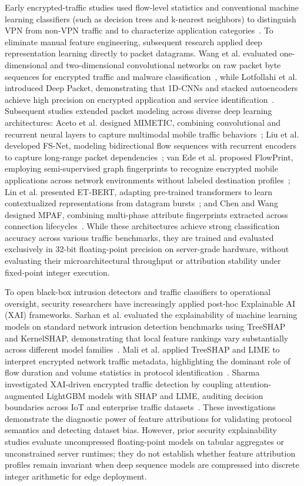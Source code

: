 \documentclass[conference]{IEEEtran}
\begin{document}
Early encrypted-traffic studies used flow-level statistics and conventional machine learning classifiers (such as decision trees and k-nearest neighbors) to distinguish VPN from non-VPN traffic and to characterize application categories~\cite{b1}. To eliminate manual feature engineering, subsequent research applied deep representation learning directly to packet datagrams. Wang et al. evaluated one-dimensional and two-dimensional convolutional networks on raw packet byte sequences for encrypted traffic and malware classification~\cite{b2}, while Lotfollahi et al. introduced Deep Packet, demonstrating that 1D-CNNs and stacked autoencoders achieve high precision on encrypted application and service identification~\cite{b3}. Subsequent studies extended packet modeling across diverse deep learning architectures: Aceto et al. designed MIMETIC, combining convolutional and recurrent neural layers to capture multimodal mobile traffic behaviors~\cite{b10}; Liu et al. developed FS-Net, modeling bidirectional flow sequences with recurrent encoders to capture long-range packet dependencies~\cite{b11}; van Ede et al. proposed FlowPrint, employing semi-supervised graph fingerprints to recognize encrypted mobile applications across network environments without labeled destination profiles~\cite{b12}; Lin et al. presented ET-BERT, adapting pre-trained transformers to learn contextualized representations from datagram bursts~\cite{b13}; and Chen and Wang designed MPAF, combining multi-phase attribute fingerprints extracted across connection lifecycles~\cite{b14}. While these architectures achieve strong classification accuracy across various traffic benchmarks, they are trained and evaluated exclusively in 32-bit floating-point precision on server-grade hardware, without evaluating their microarchitectural throughput or attribution stability under fixed-point integer execution.

To open black-box intrusion detectors and traffic classifiers to operational oversight, security researchers have increasingly applied post-hoc Explainable AI (XAI) frameworks. Sarhan et al. evaluated the explainability of machine learning models on standard network intrusion detection benchmarks using TreeSHAP and KernelSHAP, demonstrating that local feature rankings vary substantially across different model families~\cite{b15}. Mali et al. applied TreeSHAP and LIME to interpret encrypted network traffic metadata, highlighting the dominant role of flow duration and volume statistics in protocol identification~\cite{b16}. Sharma investigated XAI-driven encrypted traffic detection by coupling attention-augmented LightGBM models with SHAP and LIME, auditing decision boundaries across IoT and enterprise traffic datasets~\cite{b17}. These investigations demonstrate the diagnostic power of feature attributions for validating protocol semantics and detecting dataset bias. However, prior security explainability studies evaluate uncompressed floating-point models on tabular aggregates or unconstrained server runtimes; they do not establish whether feature attribution profiles remain invariant when deep sequence models are compressed into discrete integer arithmetic for edge deployment.
\end{document}
